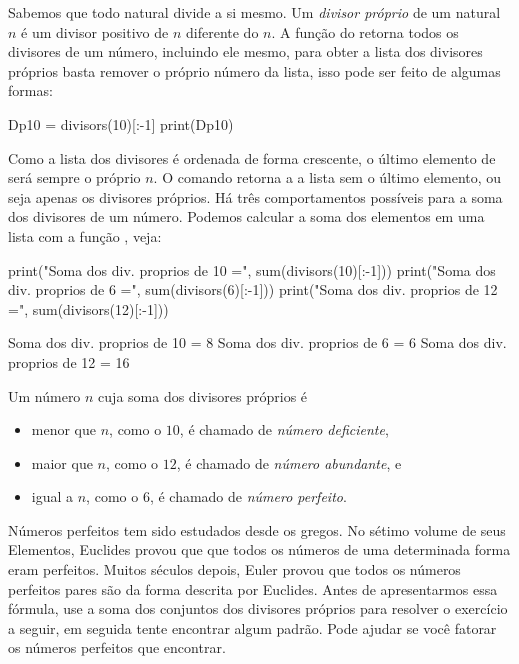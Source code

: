 Sabemos que todo natural divide a si mesmo.
Um \emph{divisor próprio} de um natural $n$ é um
divisor positivo de $n$ diferente do $n$. A função
 do \Sage retorna todos os divisores 
de um número, incluindo ele mesmo, para obter a lista
dos divisores próprios basta remover o próprio número
da lista, isso pode ser feito de algumas formas:
\begin{sageinput}
Dp10 = divisors(10)[:-1]
print(Dp10)
\end{sageinput}
\begin{sageoutput}
[1, 2, 5]
\end{sageoutput}
Como a lista dos divisores é ordenada de forma crescente,
o último elemento de  será sempre o próprio
$n$. O comando  retorna a
a lista  sem o último elemento, ou seja
apenas os divisores próprios. Há três comportamentos
possíveis para a soma dos divisores de um número. Podemos
calcular a soma dos elementos em uma lista com a função
, veja:
\begin{sageinput}
print("Soma dos div. proprios de 10 =", sum(divisors(10)[:-1]))
print("Soma dos div. proprios de 6 =", sum(divisors(6)[:-1]))
print("Soma dos div. proprios de 12 =", sum(divisors(12)[:-1]))
\end{sageinput}
\begin{sageoutput}
Soma dos div. proprios de 10 = 8
Soma dos div. proprios de 6 = 6
Soma dos div. proprios de 12 = 16
\end{sageoutput}

Um número $n$ cuja soma dos divisores próprios é
\begin{itemize}
  \item menor que $n$, como o $10$, é chamado de \emph{número
deficiente},  
  \item maior que $n$, como o $12$, é chamado de \emph{número
  abundante}, e
  \item igual a $n$, como o $6$, é chamado de \emph{número
  perfeito}.
\end{itemize}

Números perfeitos tem sido estudados desde os gregos. No
sétimo volume de seus Elementos, Euclides provou que
que todos os números de uma determinada forma eram perfeitos.
Muitos séculos depois,
Euler provou que todos os números perfeitos pares são da forma
descrita por Euclides. Antes de apresentarmos essa fórmula,
use a soma dos conjuntos dos divisores próprios para resolver
o exercício a seguir, em seguida tente encontrar algum padrão.
Pode ajudar se você fatorar os números perfeitos que encontrar.

